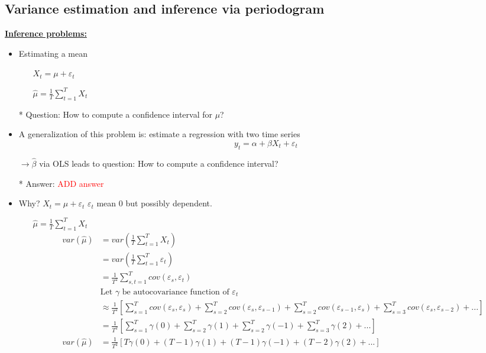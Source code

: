 \subsection{Variance estimation and inference via periodogram}

\textbf{\underline{Inference problems:}}

\begin{itemize}
    \item Estimating a mean 
    \begin{itemize}
        \item[]$X_t=\mu + \varepsilon_t$
        \item[] $\hat{\mu}= \frac{1}{T} \sum_{t=1}^T X_t$ 
    \end{itemize}
    \item[*] Question: How to compute a confidence interval for $\mu$? 
    \item A generalization of this problem is: estimate a regression with two time series \[y_t=\alpha+\beta X_t +\varepsilon_t\]
    \item[] $\rightarrow \hat{\beta}$ via OLS leads to question: How to compute a confidence interval? 
    \item[*] Answer: \textcolor{red}{ADD answer}
    \item Why? $X_t = \mu + \varepsilon_t$ $\varepsilon_t$ mean $0$ but possibly dependent.
    \begin{itemize}
        \item[] $\hat{\mu}= \frac{1}{T} \sum_{t=1}^T X_t$
        \begin{align*}
            var(\hat{\mu}) &= var(\frac{1}{T} \sum_{t=1}^T X_t) \\
            &= var(\frac{1}{T} \sum_{t=1}^T \varepsilon_t) \\
            &= \frac{1}{T^2} \sum_{s,t=1}^T cov(\varepsilon_s, \varepsilon_t) \\
            &\text{Let $\gamma$ be autocovariance function of $\varepsilon_t$} \\
            &\approx \frac{1}{T^2} \left[ \sum_{s=1}^T cov(\varepsilon_s, \varepsilon_s) + \sum_{s=2}^T cov(\varepsilon_{s}, \varepsilon_{s-1}) +  \sum_{s=2}^T cov(\varepsilon_{s-1}, \varepsilon_{s})  + \sum_{s=3}^T cov(\varepsilon_{s}, \varepsilon_{s-2}) + ...\right] \\
            &=\frac{1}{T^2} \left[\sum_{s=1}^T \gamma(0) +  \sum_{s=2}^T \gamma(1) + \sum_{s=2}^T \gamma(-1) + \sum_{s=3}^T \gamma(2) + ... \right] \\
            var(\hat{\mu}) &= \frac{1}{T^2} \left[T\gamma(0) + (T-1)\gamma(1) + (T-1)\gamma(-1) + (T-2)\gamma(2) + ... \right]\\

\end{align*}
\end{itemize}
\end{itemize}
